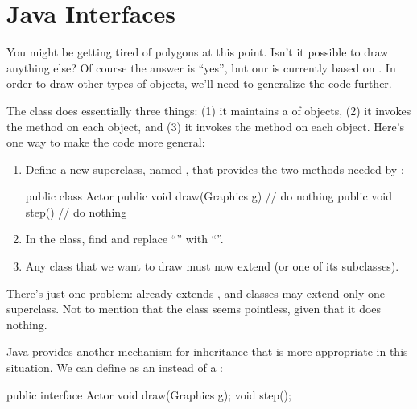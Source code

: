 \section{Java Interfaces}

You might be getting tired of polygons at this point.
Isn't it possible to draw anything else?
Of course the answer is ``yes'', but our  is currently based on .
In order to draw other types of objects, we'll need to generalize the code further.

The  class does essentially three things: (1) it maintains a  of objects, (2) it invokes the  method on each object, and (3) it invokes the  method on each object.
Here's one way to make the code more general:

\begin{enumerate}

\item
Define a new superclass, named , that provides the two methods needed by :

\begin{code}
public class Actor {
    public void draw(Graphics g) {
        // do nothing
    }
    public void step() {
        // do nothing
    }
}
\end{code}

\item
In the  class, find and replace ``'' with ``''.

\item
Any class that we want to draw must now extend  (or one of its subclasses).

\end{enumerate}

There's just one problem:  already extends , and classes may extend only one superclass.
Not to mention that the  class seems pointless, given that it does nothing.


Java provides another mechanism for inheritance that is more appropriate in this situation.
We can define  as an  instead of a :

\begin{code}
public interface Actor {
    void draw(Graphics g);
    void step();
}
\end{code}

